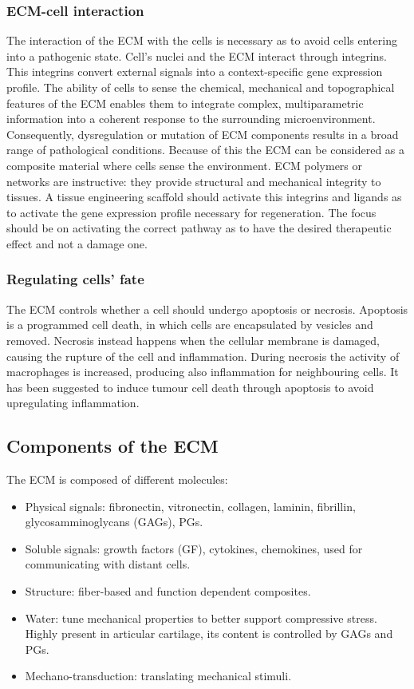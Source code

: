 		\subsubsection{ECM-cell interaction}
		The interaction of the ECM with the cells is necessary as to avoid cells entering into a pathogenic state.
		Cell's nuclei and the ECM interact through integrins.
		This integrins convert external signals into a context-specific gene expression profile.
		The ability of cells to sense the chemical, mechanical and topographical features of the ECM enables them to integrate complex, multiparametric information into a coherent response to the surrounding microenvironment.
		Consequently, dysregulation or mutation of ECM components results in a broad range of pathological conditions.
		Because of this the ECM can be considered as a composite material where cells sense the environment.
		ECM polymers or networks are instructive: they provide structural and mechanical integrity to tissues.
		A tissue engineering scaffold should activate this integrins and ligands as to activate the gene expression profile necessary for regeneration.
		The focus should be on activating the correct pathway as to have the desired therapeutic effect and not a damage one.

		\subsubsection{Regulating cells' fate}
		The ECM controls whether a cell should undergo apoptosis or necrosis.
		Apoptosis is a programmed cell death, in which cells are encapsulated by vesicles and removed.
		Necrosis instead happens when the cellular membrane is damaged, causing the rupture of the cell and inflammation.
		During necrosis the activity of macrophages is increased, producing also inflammation for neighbouring cells.
		It has been suggested to induce tumour cell death through apoptosis to avoid upregulating inflammation.

	\subsection{Components of the ECM}
	The ECM is composed of different molecules:

	\begin{multicols}{2}
		\begin{itemize}
			\item Physical signals: fibronectin, vitronectin, collagen, laminin, fibrillin, glycosamminoglycans (GAGs), PGs.
			\item Soluble signals: growth factors (GF), cytokines, chemokines, used for communicating with distant cells.
			\item Structure: fiber-based and function dependent composites.
			\item Water: tune mechanical properties to better support compressive stress.
				Highly present in articular cartilage, its content is controlled by GAGs and PGs.
			\item Mechano-transduction: translating mechanical stimuli.
		\end{itemize}
	\end{multicols}

